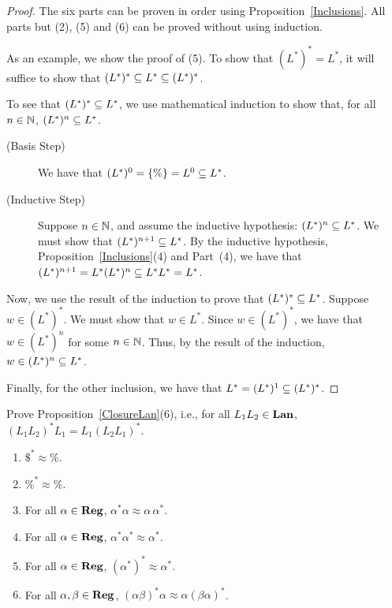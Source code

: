 \begin{proof}
The six parts can be proven in order using
Proposition~\ref{Inclusions}.  All parts but (2), (5) and (6) can be
proved without using induction.

As an example, we show the proof of (5).  To show that
$(L^*)^*=L^*$, it will suffice to show that $(L^*)^*\subseteq L^*\subseteq
(L^*)^*$.

To see that $(L^*)^*\subseteq L^*$, we use mathematical induction
to show that, for all $n\in\mathbb{N}$,
$(L^*)^n\subseteq L^*$.
\begin{description}
\item[\quad(Basis Step)] We have that $(L^*)^0=\{\%\}=L^0\subseteq L^*$.

\item[\quad(Inductive Step)] Suppose $n\in\mathbb{N}$, and assume the inductive
hypothesis: $(L^*)^n\subseteq L^*$.  We must show that $(L^*)^{n+1}\subseteq
L^*$.  By the inductive hypothesis, Proposition~\ref{Inclusions}(4) and
Part~(4), we have that $(L^*)^{n+1}=L^*(L^*)^n\subseteq L^*L^*=L^*$.
\end{description}

Now, we use the result of the induction to prove that
$(L^*)^*\subseteq L^*$.  Suppose $w\in (L^*)^*$.  We must show that
$w\in L^*$.  Since $w\in (L^*)^*$, we have that $w\in 
(L^*)^n$ for some $n\in\mathbb{N}$.  Thus, by the result of the
induction, $w\in (L^*)^n\subseteq L^*$.

Finally, for the other inclusion, we have that $L^*=(L^*)^1\subseteq
(L^*)^*$.
\end{proof}

\begin{exercise}
Prove Proposition~\ref{ClosureLan}(6), i.e., for all
$L_1L_2\in\mathbf{Lan}$, $(L_1L_2)^*L_1 = L_1(L_2L_1)^*$.
\end{exercise}

\begin{proposition}
\label{ClosureReg}
\begin{enumerate}[(1)]
\item $\$^*\approx\%$.

\item $\%^*\approx\%$.

\item For all $\alpha\in\mathbf{Reg}$, $\alpha^*\alpha \approx \alpha\,\alpha^*$.

\item For all $\alpha\in\mathbf{Reg}$, $\alpha^*\alpha^* \approx \alpha^*$.

\item For all $\alpha\in\mathbf{Reg}$, $(\alpha^*)^* \approx \alpha^*$.

\item For all $\alpha,\beta\in\mathbf{Reg}$,
$(\alpha\beta)^*\alpha \approx \alpha(\beta\alpha)^*$.
\end{enumerate}
\end{proposition}

